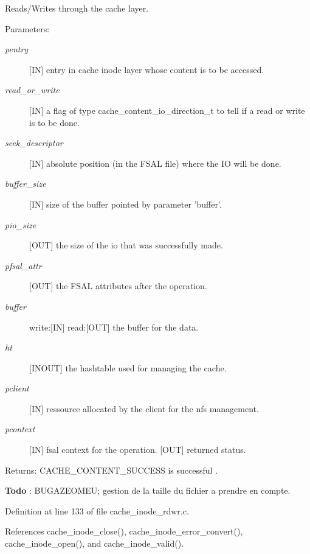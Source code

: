 Reads/Writes through the cache layer.

\begin{Desc}
\item[Parameters:]
\begin{description}
\item[{\em pentry}][IN] entry in cache inode layer whose content is to be accessed. \item[{\em read\_\-or\_\-write}][IN] a flag of type cache\_\-content\_\-io\_\-direction\_\-t to tell if a read or write is to be done. \item[{\em seek\_\-descriptor}][IN] absolute position (in the FSAL file) where the IO will be done. \item[{\em buffer\_\-size}][IN] size of the buffer pointed by parameter 'buffer'. \item[{\em pio\_\-size}][OUT] the size of the io that was successfully made. \item[{\em pfsal\_\-attr}][OUT] the FSAL attributes after the operation. \item[{\em buffer}]write:[IN] read:[OUT] the buffer for the data. \item[{\em ht}][INOUT] the hashtable used for managing the cache. \item[{\em pclient}][IN] ressource allocated by the client for the nfs management. \item[{\em pcontext}][IN] fsal context for the operation.  [OUT] returned status.\end{description}
\end{Desc}
\begin{Desc}
\item[Returns:]CACHE\_\-CONTENT\_\-SUCCESS is successful .\end{Desc}


\begin{Desc}
\item[{\bf Todo}]: BUGAZEOMEU; gestion de la taille du fichier a prendre en compte. \end{Desc}


Definition at line 133 of file cache\_\-inode\_\-rdwr.c.

References cache\_\-inode\_\-close(), cache\_\-inode\_\-error\_\-convert(), cache\_\-inode\_\-open(), and cache\_\-inode\_\-valid().